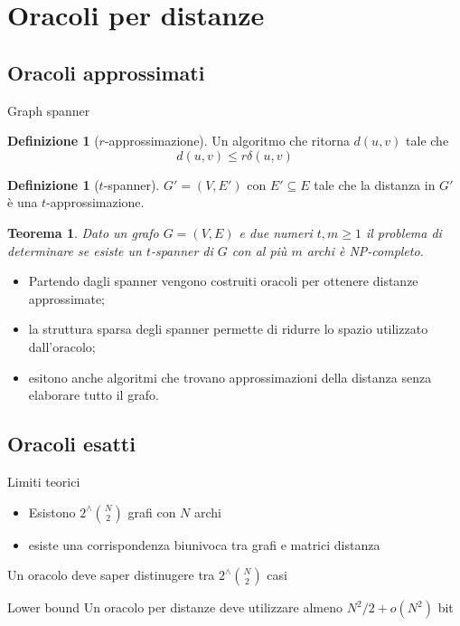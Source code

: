 \documentclass{beamer}
\newcounter{counter1}
\theoremstyle{plain}
\newtheorem{myteo}[counter1]{Teorema}
\theoremstyle{definition}
\newtheorem{mydef}[counter1]{Definizione}
\theoremstyle{remark}
\newcommand{\pa}[1]{\left(#1\right)}
\begin{document}
\section{Oracoli per distanze}

\subsection{Oracoli approssimati}

\begin{frame}{Graph spanner}
  \begin{mydef}[$r$-approssimazione]
    Un algoritmo che ritorna $d(u,v)$ tale che
    \[ d\pa{u,v} \le r \delta\pa{u,v} \]
  \end{mydef}

  \begin{mydef}[$t$-spanner]
    $G' = (V,E')$ con $E' \subseteq E$ tale che la distanza in $G'$
    \`e una $t$-approssimazione.
  \end{mydef}

  \begin{myteo}
    Dato un grafo $G = (V,E)$ e due numeri $t,m\ge 1$ il problema di
    determinare se esiste un $t$-spanner di $G$ con al pi\`u $m$ archi
    \`e NP-completo.
  \end{myteo}
\end{frame}

\begin{frame}{}
  \begin{itemize}
  \item Partendo dagli spanner vengono costruiti oracoli per ottenere
    distanze approssimate;
  \item la struttura sparsa degli spanner permette di ridurre lo
    spazio utilizzato dall'oracolo;
  \item esitono anche algoritmi che trovano approssimazioni della
    distanza senza elaborare tutto il grafo.
  \end{itemize}
\end{frame}

\subsection{Oracoli esatti}

\begin{frame}{Limiti teorici}
  \begin{itemize}
  \item Esistono $2 ^\wedge \binom{ N}{2}$ grafi con $N$ archi
  \item esiste una corrispondenza biunivoca tra grafi e matrici
    distanza
  \end{itemize}
  \pause \vfill

  Un oracolo deve saper distinugere tra $2 ^\wedge {\binom{ N}{2}}$
  casi \pause
  \begin{block}{Lower bound}
    Un oracolo per distanze deve utilizzare almeno $N^2 / 2 + o(N^2)$
    bit
  \end{block}
\end{frame}
\end{document}
